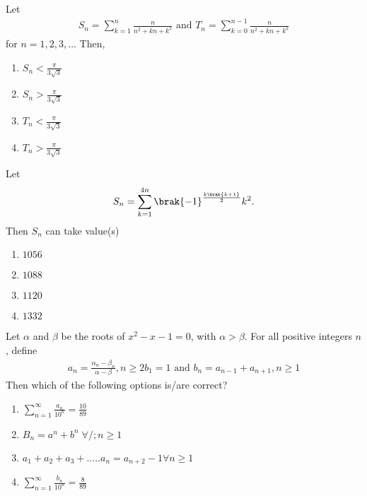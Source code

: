 \item Let 
\begin{align*}
S_n=\sum_{k=1}^{n}\frac{n}{n^2+kn+k^2} \text{ and }   T_n=\sum_{k=0}^{n-1}\frac{n}{n^2+kn+k^2}
\end{align*}
for $n=1,2,3,\dots$ Then,\hfill{}
\begin{multicols}{4}
\begin{enumerate}
\item $S_n<\frac{\pi}{3\sqrt{3}}$
\item $S_n>\frac{\pi}{3\sqrt{3}}$
\item $T_n<\frac{\pi}{3\sqrt{3}}$
\item $T_n>\frac{\pi}{3\sqrt{3}}$
\end{enumerate}
\end{multicols}

\item Let \begin{align*} S_n=\sum_{k=1}^{4n}\brak{-1}^\frac{k\brak{k+1}}{2}k^2.\end{align*}  Then $S_n$ can take value(s)  \hfill{}
\begin{multicols}{4}
\begin{enumerate}
\item $1056$
\item $1088$
\item $1120$
\item $1332$
\end{enumerate}
\end{multicols}

\item Let $\alpha$ and $\beta$ be the roots of $x^2-x-1=0$, with $\alpha>\beta$. For all positive integers $n$, define
\begin{align*}
a_n=\frac{\alpha_n-\beta_n}{\alpha-\beta},n\geq2
b_1=1  \text{ and }  b_n=a_{n-1}+a_{n+1},n\geq1
\end{align*}
Then which of the following options is/are correct?
\hfill{}
\begin{multicols}{2}
\begin{enumerate}
\item $\sum_{n=1}^{\infty}\frac{a_n}{10^n}=\frac{10}{89}$
\item $B_n=a^n+b^n \; \forall /; n\geq1$
\item $a_1+a_2+a_3+.....a_n=a_{n+2}-1 \forall n\geq1$
\item $\sum_{n=1}^{\infty}\frac{b_n}{10^n}=\frac{8}{89}$
\end{enumerate}
\end{multicols}




